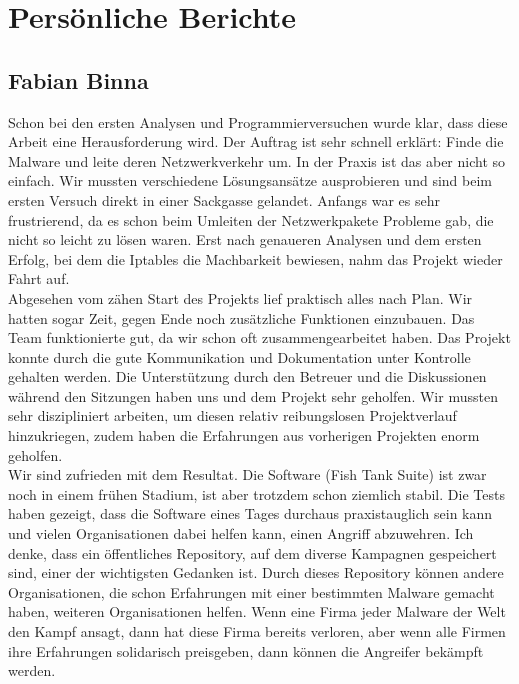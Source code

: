 \chapter{Persönliche Berichte}

\section{Fabian Binna}
Schon bei den ersten Analysen und Programmierversuchen wurde klar, dass diese Arbeit eine Herausforderung wird. Der Auftrag ist sehr schnell erklärt: Finde die Malware und leite deren Netzwerkverkehr um. In der Praxis ist das aber nicht so einfach. Wir mussten verschiedene Lösungsansätze ausprobieren und sind beim ersten Versuch direkt in einer Sackgasse gelandet. Anfangs war es sehr frustrierend, da es schon beim Umleiten der Netzwerkpakete Probleme gab, die nicht so leicht zu lösen waren. Erst nach genaueren Analysen und dem ersten Erfolg, bei dem die Iptables die Machbarkeit bewiesen, nahm das Projekt wieder Fahrt auf.\\

Abgesehen vom zähen Start des Projekts lief praktisch alles nach Plan. Wir hatten sogar Zeit, gegen Ende noch zusätzliche Funktionen einzubauen. Das Team funktionierte gut, da wir schon oft zusammengearbeitet haben. Das Projekt konnte durch die gute Kommunikation und Dokumentation unter Kontrolle gehalten werden. Die Unterstützung durch den Betreuer und die Diskussionen während den Sitzungen haben uns und dem Projekt sehr geholfen. Wir mussten sehr diszipliniert arbeiten, um diesen relativ reibungslosen Projektverlauf hinzukriegen, zudem haben die Erfahrungen aus vorherigen Projekten enorm geholfen.\\

Wir sind zufrieden mit dem Resultat. Die Software (Fish Tank Suite) ist zwar noch in einem frühen Stadium, ist aber trotzdem schon ziemlich stabil. Die Tests haben gezeigt, dass die Software eines Tages durchaus praxistauglich sein kann und vielen Organisationen dabei helfen kann, einen Angriff abzuwehren. Ich denke, dass ein öffentliches Repository, auf dem diverse Kampagnen gespeichert sind, einer der wichtigsten Gedanken ist. Durch dieses Repository können andere Organisationen, die schon Erfahrungen mit einer bestimmten Malware gemacht haben, weiteren Organisationen helfen. Wenn eine Firma jeder Malware der Welt den Kampf ansagt, dann hat diese Firma bereits verloren, aber wenn alle Firmen ihre Erfahrungen solidarisch preisgeben, dann können die Angreifer bekämpft werden.

